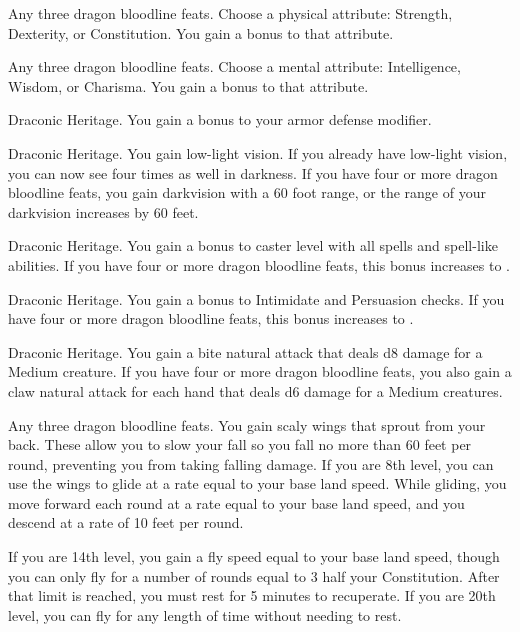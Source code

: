 \featpre Any three dragon bloodline feats.
\featben Choose a physical attribute: Strength, Dexterity, or Constitution. You gain a  bonus to that attribute.

\featpre Any three dragon bloodline feats.
\featben Choose a mental attribute: Intelligence, Wisdom, or Charisma. You gain a  bonus to that attribute.

 Draconic Heritage.
 You gain a  bonus to your armor defense modifier.

 Draconic Heritage.
 You gain low-light vision. If you already have low-light vision, you can now see four times as well in darkness. If you have four or more dragon bloodline feats, you gain darkvision with a 60 foot range, or the range of your darkvision increases by 60 feet.

 Draconic Heritage.
 You gain a  bonus to caster level with all spells and spell-like abilities. If you have four or more dragon bloodline feats, this bonus increases to .

 Draconic Heritage.
 You gain a  bonus to Intimidate and Persuasion checks. If you have four or more dragon bloodline feats, this bonus increases to .

 Draconic Heritage.
 You gain a bite natural attack that deals d8 damage for a Medium creature. If you have four or more dragon bloodline feats, you also gain a claw natural attack for each hand that deals d6 damage for a Medium creatures.

 Any three dragon bloodline feats.
 You gain scaly wings that sprout from your back. These allow you to slow your fall so you fall no more than 60 feet per round, preventing you from taking falling damage. If you are 8th level, you can use the wings to glide at a rate equal to your base land speed. While gliding, you move forward each round at a rate equal to your base land speed, and you descend at a rate of 10 feet per round.

If you are 14th level, you gain a fly speed equal to your base land speed, though you can only fly for a number of rounds equal to 3 \add half your Constitution. After that limit is reached, you must rest for 5 minutes to recuperate. If you are 20th level, you can fly for any length of time without needing to rest.

